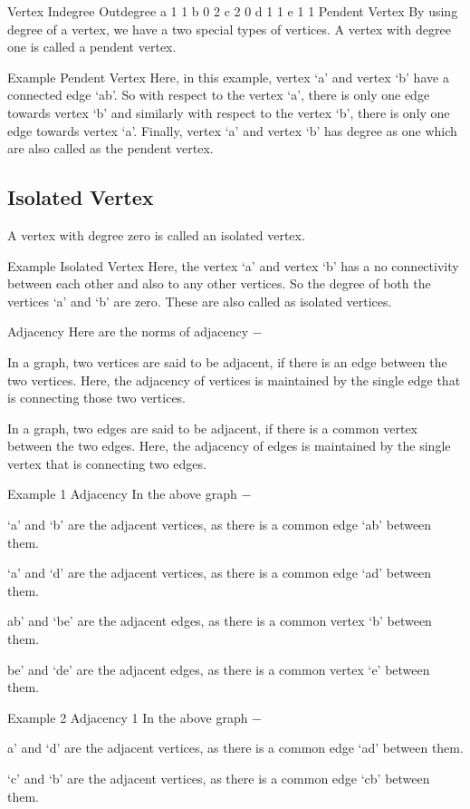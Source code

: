 Vertex	Indegree	Outdegree
a	1	1
b	0	2
c	2	0
d	1	1
e	1	1
Pendent Vertex
By using degree of a vertex, we have a two special types of vertices. A vertex with degree one is called a pendent vertex.

Example
Pendent Vertex
Here, in this example, vertex ‘a’ and vertex ‘b’ have a connected edge ‘ab’. So with respect to the vertex ‘a’, there is only one edge towards vertex ‘b’ and similarly with respect to the vertex ‘b’, there is only one edge towards vertex ‘a’. Finally, vertex ‘a’ and vertex ‘b’ has degree as one which are also called as the pendent vertex.

\subsection{Isolated Vertex}
A vertex with degree zero is called an isolated vertex.

Example
Isolated Vertex
Here, the vertex ‘a’ and vertex ‘b’ has a no connectivity between each other and also to any other vertices. So the degree of both the vertices ‘a’ and ‘b’ are zero. These are also called as isolated vertices.

Adjacency
Here are the norms of adjacency −

In a graph, two vertices are said to be adjacent, if there is an edge between the two vertices. Here, the adjacency of vertices is maintained by the single edge that is connecting those two vertices.

In a graph, two edges are said to be adjacent, if there is a common vertex between the two edges. Here, the adjacency of edges is maintained by the single vertex that is connecting two edges.

Example 1
Adjacency
In the above graph −

‘a’ and ‘b’ are the adjacent vertices, as there is a common edge ‘ab’ between them.

‘a’ and ‘d’ are the adjacent vertices, as there is a common edge ‘ad’ between them.

ab’ and ‘be’ are the adjacent edges, as there is a common vertex ‘b’ between them.

be’ and ‘de’ are the adjacent edges, as there is a common vertex ‘e’ between them.

Example 2
Adjacency 1
In the above graph −

a’ and ‘d’ are the adjacent vertices, as there is a common edge ‘ad’ between them.

‘c’ and ‘b’ are the adjacent vertices, as there is a common edge ‘cb’ between them.

